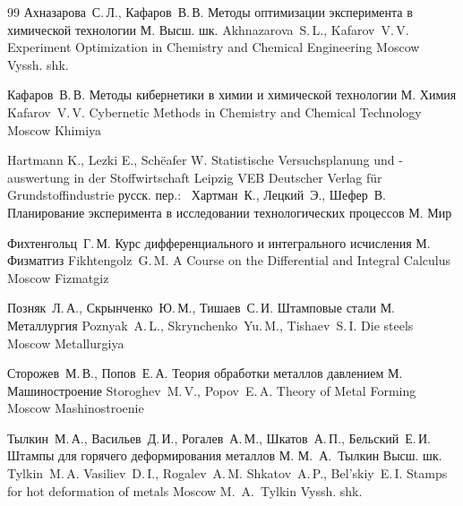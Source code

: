 \begin{thebibliography}{99}
\by Ахназарова~С.\,Л., Кафаров~В.\,В.
\book Методы оптимизации эксперимента в химической технологии
\publaddr М.
\publ Высш. шк.
\misctransl
\by Akhnazarova~S.\,L., Kafarov~V.\,V.
\book Experiment Optimization in Chemistry and Chemical Engineering 
\publaddr Moscow
\publ Vyssh. shk.

\by Кафаров~В.\,В.
\book Методы кибернетики в химии и химической технологии
\publaddr М.
\publ Химия
\misctransl
\by Kafarov~V.\,V.
\book Cybernetic Methods in Chemistry and Chemical Technology
\publaddr Moscow
\publ Khimiya

\by Hartmann K., Lezki E., Sch\"eafer W.
\book Statistische Versuchsplanung und -auswertung in der Stoffwirtschaft
\publaddr Leipzig
\publ VEB Deutscher Verlag f\"ur Grundstoffindustrie
\rtransl русск. пер.:~
\by Хартман~К., Лецкий~Э., Шефер~В.
\book Планирование эксперимента в исследовании технологических процессов
\publaddr М.
\publ Мир

\by Фихтенгольц~Г.\,М.
\book Курс дифференциального и интегрального исчисления
\publaddr М.
\publ Физматгиз
\misctransl
\by Fikhtengolz~G.\,M.
\book A Course on the Differential and Integral Calculus
\publaddr Moscow
\publ Fizmatgiz

\by Позняк~Л.\,А., Скрынченко~Ю.\,М., Тишаев~С.\,И.
\book Штамповые стали
\publaddr М.
\publ Металлургия
\misctransl
\by Poznyak~A.\,L., Skrynchenko~Yu.\,M., Tishaev~S.\,I.
\book Die steels
\publaddr Moscow
\publ Metallurgiya

\by Сторожев~М.\,В., Попов~Е.\,А.
\book Теория обработки металлов давлением
\publaddr М.
\publ Машиностроение
\misctransl
\by Storoghev~M.\,V., Popov~E.\,A.
\book Theory of Metal Forming
\publaddr Moscow
\publ Mashinostroenie


\by Тылкин~М.\,А., Васильев~Д.\,И., Рогалев~А.\,М., Шкатов~А.\,П., Бельский~Е.\,И.
\book Штампы для горячего деформирования металлов
\publaddr М.
\ed М.~А.~Тылкин
\publ Высш. шк.
\misctransl
\by Tylkin~M.\,A. Vasiliev~D.\,I., Rogalev~A.\,M. Shkatov~A.\,P., Bel'skiy~E.\,I.
\book Stamps for hot deformation of metals
\publaddr Moscow
\ed M.~A.~Tylkin
\publ Vyssh. shk.

\end{thebibliography}




